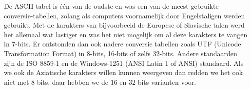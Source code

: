 De ASCII-tabel is \'e\'en van de oudste en was een van de meest gebruikte conversie-tabellen, zolang als computers voornamelijk door Engelstaligen werden gebruikt. Met de karakters van bijvoorbeeld de Europese of Slavische talen werd het allemaal wat lastiger en was het niet mogelijk om al deze karakters te vangen in 7-bits. Er ontstonden dan ook nadere conversie tabellen zoals UTF (Unicode Transformation Format) in 8-bits, 16-bits of zelfs 32-bits. Andere standaarden zijn de ISO 8859-1 en de Windows-1251 (ANSI Latin 1 of ANSI) standaard. Als we ook de Aziatische karakters willen kunnen weergeven dan redden we het ook niet met 8-bits, daar hebben we de 16 en 32-bits varianten voor.


